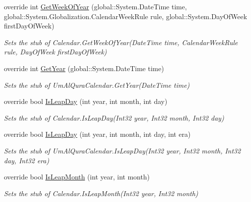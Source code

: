 \begin{DoxyCompactItemize}
override int \hyperlink{class_system_1_1_globalization_1_1_fakes_1_1_stub_um_al_qura_calendar_aa8f2dcb0793a871de5a77ca36539832b}{Get\-Week\-Of\-Year} (global\-::\-System.\-Date\-Time time, global\-::\-System.\-Globalization.\-Calendar\-Week\-Rule rule, global\-::\-System.\-Day\-Of\-Week first\-Day\-Of\-Week)
\begin{DoxyCompactList}\small\item\em Sets the stub of Calendar.\-Get\-Week\-Of\-Year(\-Date\-Time time, Calendar\-Week\-Rule rule, Day\-Of\-Week first\-Day\-Of\-Week)\end{DoxyCompactList}\item 
override int \hyperlink{class_system_1_1_globalization_1_1_fakes_1_1_stub_um_al_qura_calendar_aecfb97298501cc07846f20c078dfbe5d}{Get\-Year} (global\-::\-System.\-Date\-Time time)
\begin{DoxyCompactList}\small\item\em Sets the stub of Um\-Al\-Qura\-Calendar.\-Get\-Year(\-Date\-Time time)\end{DoxyCompactList}\item 
override bool \hyperlink{class_system_1_1_globalization_1_1_fakes_1_1_stub_um_al_qura_calendar_ab3b679eeb13bef8ea4abf10ff98f369e}{Is\-Leap\-Day} (int year, int month, int day)
\begin{DoxyCompactList}\small\item\em Sets the stub of Calendar.\-Is\-Leap\-Day(\-Int32 year, Int32 month, Int32 day)\end{DoxyCompactList}\item 
override bool \hyperlink{class_system_1_1_globalization_1_1_fakes_1_1_stub_um_al_qura_calendar_a5d32bfbdb0e9e11be1624e298763d831}{Is\-Leap\-Day} (int year, int month, int day, int era)
\begin{DoxyCompactList}\small\item\em Sets the stub of Um\-Al\-Qura\-Calendar.\-Is\-Leap\-Day(\-Int32 year, Int32 month, Int32 day, Int32 era)\end{DoxyCompactList}\item 
override bool \hyperlink{class_system_1_1_globalization_1_1_fakes_1_1_stub_um_al_qura_calendar_af82f80be155c7faf434a6eeb4ab79e5a}{Is\-Leap\-Month} (int year, int month)
\begin{DoxyCompactList}\small\item\em Sets the stub of Calendar.\-Is\-Leap\-Month(\-Int32 year, Int32 month)\end{DoxyCompactList}\item 

\end{DoxyCompactItemize}
